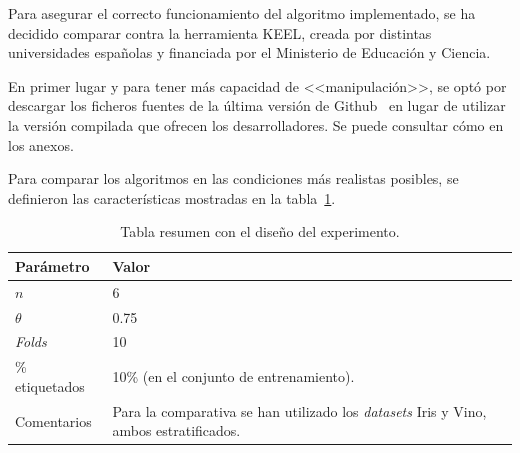 Para asegurar el correcto funcionamiento del algoritmo implementado, se ha decidido comparar contra la herramienta KEEL, creada por distintas universidades españolas y financiada por el Ministerio de Educación y Ciencia.

En primer lugar y para tener más capacidad de <<manipulación>>, se optó por descargar los ficheros fuentes de la última versión de Github~\cite{keelRepo} en lugar de utilizar la versión compilada que ofrecen los desarrolladores. Se puede consultar cómo en los anexos.

Para comparar los algoritmos en las condiciones más realistas posibles, se definieron las características mostradas en la tabla~\ref{tabla_coforest_keelvsnuestro_diseño}.

\begin{table}
	\begin{centering}
		\begin{tabular}{@{}p{10em} p{20em} @{}}
			\toprule
			\textbf{Parámetro} & \textbf{Valor} \\ 
			\midrule
			$n$ & 6\\
			$\theta$ & 0.75 \\
			\textit{Folds} & 10 \\
			\% etiquetados & 10\% (en el conjunto de entrenamiento). \\
			Comentarios & Para la comparativa se han utilizado los \textit{datasets} Iris y Vino, ambos estratificados.\\
			\bottomrule
			
		\end{tabular}
	\end{centering}
	\caption[\textit{Co-forest}: resumen del experimento]{Tabla resumen con el diseño del experimento.}
	\label{tabla_coforest_keelvsnuestro_diseño}	
\end{table}

